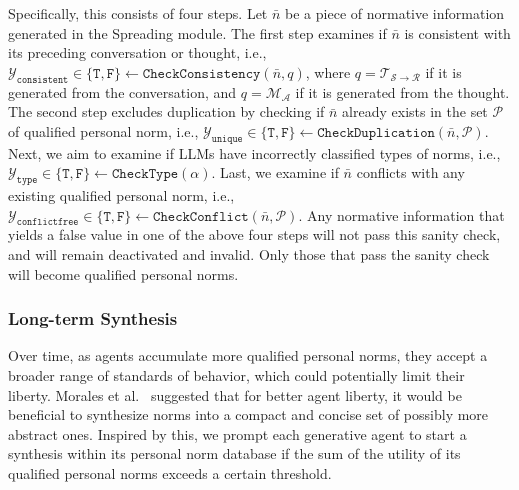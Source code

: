 \documentclass{article}
\begin{document}
Specifically, this consists of four steps.
Let $\bar{n}$ be a piece of normative information generated in the Spreading module. The first step examines if $\bar{n}$ is consistent with its preceding conversation or thought, i.e., $\mathcal{Y}_\texttt{consistent} \in \{\texttt{T}, \texttt{F}\} \leftarrow \texttt{CheckConsistency}(\bar{n}, q)$,
where $q=\mathcal{T_{S\rightarrow R}}$ if it is generated from the conversation, and  $q=\mathcal{M_A}$ if it is generated from the thought. 
The second step excludes duplication by checking if $\bar{n}$ already exists in the set $\mathcal{P}$ of qualified personal norm, i.e., $ \mathcal{Y}_{\texttt{unique}} \in \{\texttt{T}, \texttt{F}\} \leftarrow \texttt{CheckDuplication}(\bar{n}, \mathcal{P})$. Next, we aim to examine if LLMs have incorrectly classified types of norms,  i.e., $\mathcal{Y}_{\texttt{type}} \in \{\texttt{T}, \texttt{F}\} \leftarrow \texttt{CheckType}(\alpha)$. Last, we examine if $\bar{n}$ conflicts with any existing qualified personal norm, i.e., $\mathcal{Y}_{\texttt{conflictfree}} \in \{\texttt{T}, \texttt{F}\} \leftarrow \texttt{CheckConflict}(\bar{n}, \mathcal{P})$.
Any normative information that yields a false value  in one of the above four steps will not pass this sanity check, and will remain deactivated and invalid. Only those that pass the sanity check will become qualified personal norms. 
 

\vspace{-0.1cm}
 \subsubsection{Long-term Synthesis}
Over time, as agents accumulate more qualified 
personal norms, they accept a broader range of standards of behavior, which could potentially limit their liberty. Morales et al.~ suggested that for better agent liberty, it would be beneficial to synthesize norms into a compact and concise set of possibly more abstract ones. 
Inspired by this, we prompt each generative agent to 
start a synthesis within its personal norm database if the sum of the utility of its qualified personal norms exceeds a certain threshold.
\end{document}
